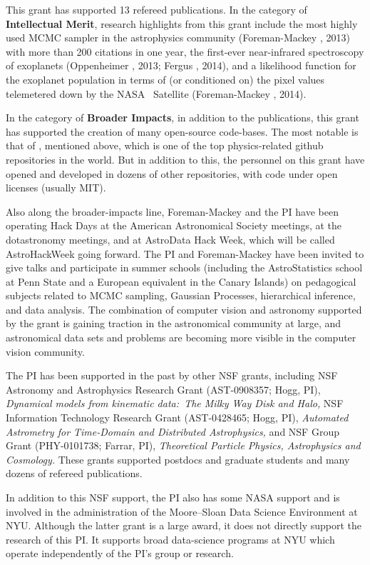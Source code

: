 \documentclass[12pt]{article}
\begin{document}
This grant has supported 13 refereed publications.
In the category of \textbf{Intellectual Merit},
research highlights from this grant include the most highly used MCMC
sampler in the astrophysics community (Foreman-Mackey \etal, 2013)
with more than 200 citations in one year, the
first-ever near-infrared spectroscopy of exoplanets (Oppenheimer \etal, 2013;
Fergus \etal, 2014), and a likelihood function for the exoplanet population
in terms of (or conditioned on) the pixel values telemetered down by
the NASA \kepler\ Satellite (Foreman-Mackey \etal, 2014).

In the category of \textbf{Broader Impacts},
in addition to the publications, this grant has supported the creation of
many open-source code-bases.
The most notable is that of , mentioned above, which is
one of the top physics-related github repositories in the world.
But in addition to this, the personnel on this grant have opened and
developed in dozens of other repositories, with code under open
licenses (usually MIT).

Also along the broader-impacts line, Foreman-Mackey and the PI have
been operating Hack Days at the American Astronomical Society
meetings, at the dotastronomy meetings, and at AstroData Hack Week,
which will be called AstroHackWeek going forward.
The PI and Foreman-Mackey have been invited to give talks and
participate in summer schools (including the AstroStatistics school at
Penn State and a European equivalent in the Canary Islands) on
pedagogical subjects related to MCMC sampling, Gaussian Processes,
hierarchical inference, and data analysis.
The combination of computer vision and astronomy supported by the
grant is gaining traction in the astronomical community at large, and
astronomical data sets and problems are becoming more visible in the
computer vision community.

The PI has been supported in the past by other NSF grants, including
NSF Astronomy and Astrophysics Research Grant (AST-0908357; Hogg, PI),
\textit{Dynamical models from kinematic data:\ The Milky Way Disk and Halo,}
NSF Information Technology Research Grant (AST-0428465; Hogg, PI),
\textit{Automated Astrometry for Time-Domain and Distributed
Astrophysics,} and
NSF Group Grant (PHY-0101738; Farrar, PI), \textit{Theoretical
Particle Physics, Astrophysics and Cosmology.}
These grants supported postdocs and graduate students and many dozens
of refereed publications.

In addition to this NSF support, the PI also has some NASA support and
is involved in the administration of the Moore--Sloan Data Science
Environment at NYU.
Although the latter grant is a large award, it does not directly
support the research of this PI.
It supports broad data-science programs at NYU which operate
independently of the PI's group or research.
\end{document}
